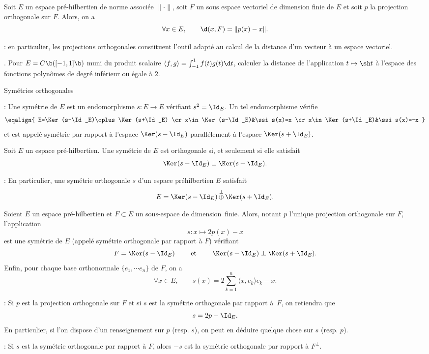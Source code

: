 \Propriete []  Soit $E$ un espace pré-hilbertien de norme associée $\|\cdot\|$, 
soit $F$ un sous espace vectoriel de dimension finie de $E$ et 
soit $p$ la projection orthogonale sur $F$. Alors, on a 
$$
\forall x\in E, \qquad \d(x,F)=\|p(x)-x\|. 
$$ 

\Remarque : en particulier, les projections orthogonales constituent l'outil adapté au calcul de la distance d'un vecteur à un espace vectoriel. 
\bigskip


\Exercice. Pour $E=\sc C\b([-1,1]\b)$ muni du produit scalaire $\langle f,g\rangle=\int_{-1}^1 f(t)g(t)\d t$, 
calculer la distance de l'application $t\mapsto \sh t$ à l'espace des fonctions polynômes de degré inférieur ou égale à $2$. 
\bigskip

\Concept [] Symétries orthogonales


\Rappel :  Une symétrie de $E$ est un endomorphisme $s:E\to E$ vérifiant $s^2=\Id_E$. Un tel endomorphisme vérifie
$$
\eqalign{
E=\Ker(s-\Id_E)\oplus\Ker(s+\Id_E)
\cr
x\in\Ker(s-\Id_E)&\ssi s(x)=x
\cr
x\in \Ker(s+\Id_E)&\ssi s(x)=-x
}
$$
et est appelé symétrie par rapport à l'espace $\Ker(s-\Id_E)$ parallélement à l'espace $\Ker(s+\Id_E)$. 
\bigskip

\Definition []  Soit $E$ un espace pré-hilbertien. Une symétrie de $E$ est orthogonale si, et seulement si elle satisfait 
$$
\Ker(s-\Id_E)\perp\Ker(s+\Id_E).
$$

\Remarque : En particulier, une symétrie orthogonale $s$ d'un espace préhilbertien $E$ satisfait 
$$
E=\Ker(s-\Id_E)\mathop{\oplus}\limits^\perp\Ker(s+\Id_E).
$$


\Propriete []  Soient $E$ un espace pré-hilbertien et $F\subset E$ un sous-espace de dimension~finie.
Alors, notant $p$ l'unique projection orthogonale sur $F$, l'application 
$$
s:x\mapsto 2p(x)-x
$$ 
est une symétrie de $E$ (appelé symétrie orthogonale par rapport à $F$) vérifiant 
$$
F=\Ker(s-\Id_E)\qquad\mbox{ et }\qquad \Ker(s-\Id_E)\perp\Ker(s+\Id_E).
$$ 
Enfin, pour chaque base orthonormale $\{e_1,\cdots e_n\}$ de $F$, on a 
$$
\forall x\in E, \qquad s(x)=2\sum_{k=1}^n\langle x,e_k\rangle e_k-x.
$$

 : Si $p$ est la projection orthogonale sur $F$ et si $s$ est la symétrie orthogonale par rapport à~$F$, on retiendra que 
$$
s=2p-\Id_E.
$$
En particulier, si l'on dispose d'un renseignement sur $p$ (resp. $s$), on peut en déduire quelque chose sur $s$ (resp. $p$). 
\bigskip

 : Si $s$ est la symétrie orthogonale par rapport à $F$, alors $-s$ est la symétrie orthogonale par rapport à $F^\perp$. 
\bigskip

